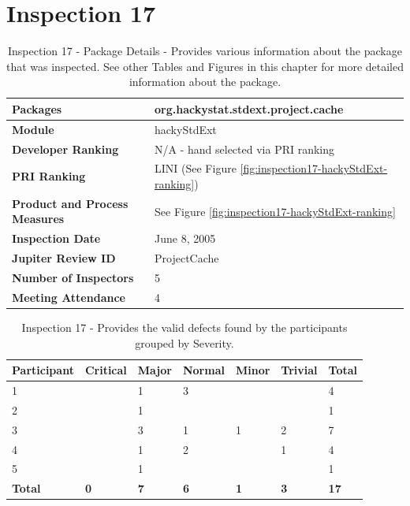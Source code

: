\clearpage
\section{Inspection 17}
\label{appendix:section:inspection17}

\begin{table}[!h]
  \begin{center}
    \caption[Inspection 17 - Package Details]{Inspection 17 - Package Details 
      - Provides various information about the package that was
      inspected. See other Tables and Figures in this chapter for more
      detailed information about the package.}
    \label{tab:inspection-package-details-17}
    \begin{tabular}{|p{5.0cm}|p{8.0cm}|} \hline
{\bf Packages} & org.hackystat.stdext.project.cache \\ \hline
{\bf Module} & hackyStdExt \\ \hline
{\bf Developer Ranking} & N/A - hand selected via PRI ranking \\ \hline
{\bf PRI Ranking} & LINI (See Figure \ref{fig:inspection17-hackyStdExt-ranking}) \\ \hline
{\bf Product and Process Measures} & See Figure \ref{fig:inspection17-hackyStdExt-ranking} \\ \hline
{\bf Inspection Date} & June 8, 2005 \\ \hline
{\bf Jupiter Review ID} & ProjectCache \\ \hline
{\bf Number of Inspectors} & 5 \\ \hline
{\bf Meeting Attendance} & 4 \\ \hline
    \end{tabular}
  \end{center}
\end{table}

\begin{table}[!h]
  \begin{center}
    \caption[Inspection 17 - Results by Severity]{Inspection 17
      - Provides the valid defects found by the participants grouped by
      Severity.}
    \label{tab:inspection-results-17}
    \begin{tabular}{|p{2.0cm}|p{1.5cm}|p{1.5cm}|p{1.5cm}|p{1.5cm}|p{1.5cm}|p{1.5cm}|} \hline
{\bf Participant} & {\bf Critical} & {\bf Major} 
& {\bf Normal} & {\bf Minor} & {\bf Trivial} & {\bf Total} \\ \hline
1 &   & 1 & 3 &   &   & 4 \\ \hline
2 &   & 1 &   &   &   & 1 \\ \hline
3 &   & 3 & 1 & 1 & 2 & 7 \\ \hline
4 &   & 1 & 2 &   & 1 & 4 \\ \hline
5 &   & 1 &   &   &   & 1 \\ \hline
{\bf Total} & {\bf 0} & {\bf 7} & {\bf 6} & {\bf 1} & {\bf 3} & {\bf 17} \\ \hline
    \end{tabular}
  \end{center}
\end{table}

